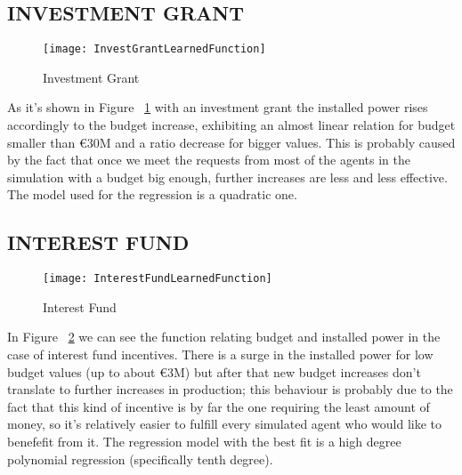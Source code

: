 \documentclass [twocolumn,a4paper,10pt]{ECMS}
\newcommand{\Subsection}[1]{\subsection*{#1}\vspace*{-0.7em}}
\begin{document}


\Subsection{INVESTMENT GRANT}

\begin{figure}[t]
	\centering
	\texttt{[image: InvestGrantLearnedFunction]}
	\caption{Investment Grant}
	\label{InvestGrantLearnedFunction}
\end{figure}

As it's shown in Figure ~\ref{InvestGrantLearnedFunction} with an investment grant the installed power rises accordingly to the budget increase, exhibiting an almost linear relation for budget smaller than \euro30M and a ratio decrease for bigger values. This is probably caused by the fact that once we meet the requests from most of the agents in the simulation with a budget big enough, further increases are less and less effective. The model used for the regression is a quadratic one.

\Subsection{INTEREST FUND}

\begin{figure}[hbt]
	\centering
	\texttt{[image: InterestFundLearnedFunction]}
	\caption{Interest Fund}
	\label{InterestFundLearnedFunction}
\end{figure}

In Figure ~\ref{InterestFundLearnedFunction} we can see the function relating budget and installed power in the case of interest fund incentives. There is a surge in the installed power for low budget values (up to about \euro3M) but after that new budget increases don't translate to further increases in production; this behaviour is probably due to the fact that this kind of incentive is by far the one requiring the least amount of money, so it's relatively easier to fulfill every simulated agent who would like to benefefit from it. The regression model with the best fit is a high degree polynomial regression (specifically tenth degree). 
\end{document}
